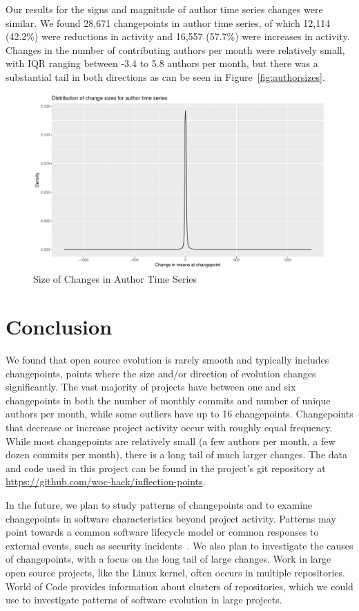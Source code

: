 \documentclass[10pt,conference]{IEEEtran}
\begin{document}
Our results for the signs and magnitude of author time series changes were similar. We found 28,671 changepoints in author time series, of which 12,114 (42.2\%) were reductions in activity and 16,557 (57.7\%) were increases in activity. Changes in the number of contributing authors per month were relatively small, with IQR ranging between -3.4 to 5.8 authors per month, but there was a substantial tail in both directions as can be seen in Figure~\ref{fig:authorsizes}.
\begin{figure}[ht!]
    \centering
    \includegraphics[width=\linewidth]{author-changesizes.pdf}
    \caption{Size of Changes in Author Time Series}
    \label{fig:commitsizes}
\end{figure}


\section{Conclusion}

We found that open source evolution is rarely smooth and typically includes changepoints, points where the size and/or direction of evolution changes significantly. The vast majority of projects have between one and six changepoints in both the number of monthly commits and number of unique authors per month, while some outliers have up to 16 changepoints. Changepoints that decrease or increase project activity occur with roughly equal frequency. While most changepoints are relatively small (a few authors per month, a few dozen commits per month), there is a long tail of much larger changes. The data and code used in this project can be found in the project's git repository at \url{https://github.com/woc-hack/inflection-points}.

In the future, we plan to study patterns of changepoints and to examine changepoints in software characteristics beyond project activity. Patterns may point towards a common software lifecycle model or common responses to external events, such as security incidents~\cite{openssl2020}. We also plan to investigate the causes of changepoints, with a focus on the long tail of large changes. Work in large open source projects, like the Linux kernel, often occurs in multiple repositories. World of Code provides information about clusters of repositories, which we could use to investigate patterns of software evolution in large projects.



\end{document}
